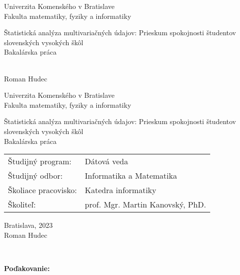 \documentclass[12pt, twoside]{book}
\def\mfrok{2023}
\def\mfnazov{Štatistická analýza multivariačných údajov: Prieskum spokojnosti študentov slovenských vysokých škôl}
\def\mftyp{Bakalárska práca}
\def\mfautor{Roman Hudec}
\def\mfskolitel{prof. Mgr. Martin Kanovský, PhD. }
\def\mfmiesto{Bratislava, \mfrok}
\def\mfodbor{ Informatika a Matematika }
\def\program{ Dátová veda }
\def\mfpracovisko{ Katedra informatiky }
\begin{document}
     
\frontmatter
\pagestyle{empty}


\begin{center}
\sc\large
Univerzita Komenského v Bratislave\\
Fakulta matematiky, fyziky a informatiky

\vfill

{\LARGE\mfnazov}\\
\mftyp
\end{center}

\vfill

{\sc\large 
\noindent \mfrok\\
\mfautor
}

\cleardoublepage

\noindent

\begin{center}
\sc  
\large
Univerzita Komenského v Bratislave\\
Fakulta matematiky, fyziky a informatiky

\vfill

{\LARGE\mfnazov}\\
\mftyp
\end{center}

\vfill

\noindent
\begin{tabular}{ll}
Študijný program: & \program \\
Študijný odbor: & \mfodbor \\
Školiace pracovisko: & \mfpracovisko \\
Školiteľ: & \mfskolitel \\
\end{tabular}

\vfill


\noindent \mfmiesto\\
\mfautor

\cleardoublepage



\newpage 
\setcounter{page}{2}






\newpage 
\pagestyle{plain}
~

\vfill
{\bf Poďakovanie:}


\newpage 
\end{document}

